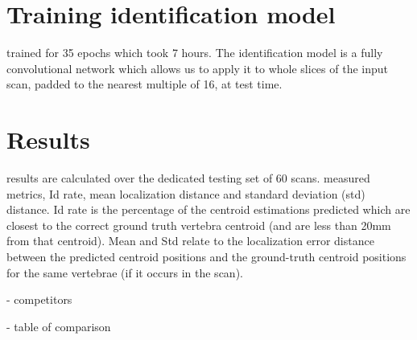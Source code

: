\section{Training identification model}
trained for 35 epochs which took 7 hours.
The identification model is a fully convolutional network which allows us to apply it to whole slices of the input scan, padded to the nearest multiple of 16, at test time.


\section{Results}
results are calculated over the dedicated testing set of
60 scans. measured metrics, Id rate, mean localization distance and standard deviation (std) distance. Id rate is the percentage of the centroid estimations predicted which are closest to the correct ground truth vertebra centroid (and are less than 20mm from that centroid). Mean and Std relate to the localization error distance between the predicted centroid positions and the ground-truth centroid positions for the same vertebrae (if it occurs in the scan).

%
- competitors

%
- table of comparison